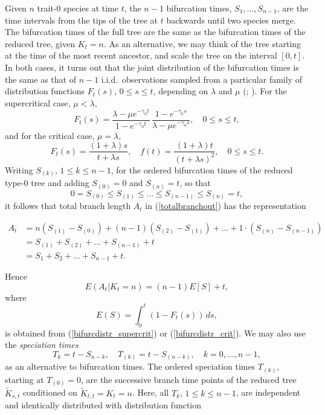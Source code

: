 \documentclass[a4paper,11pt]{article}
\theoremstyle{plain}
\theoremstyle{definition}
\numberwithin{equation}{section}
\begin{document}
Given $n$ trait-$0$ species at time $t$, the $n-1$ bifurcation
times, $S_1,\dots,S_{n-1}$, are the time intervals from the tips of
the tree at $t$ backwards until two species merge. The bifurcation
times of the full tree are the same as the bifurcation times of the
reduced tree, given $K_t=n$.  As an alternative, we may think of the
tree starting at the time of the most recent ancestor, and scale the
tree on the interval $[0,t]$.  In both cases, it turns out that the
joint distribution of the bifurcation times is the same as that of
$n-1$ i.i.d.\ observations sampled from a particular family of distribution
functions $F_t(s)$, $0\le s\le t$, depending on $\lambda$ and $\mu$
(\cite{thompson}; \cite{gernhard}). For the supercritical case, $\mu<\lambda$,
\begin{equation} \label{bifurcdistr_supercrit}
F_t(s)=\frac{\lambda-\mu e^{-\gamma_0t}}{1-e^{-\gamma_0t}}\,
\frac{1-e^{-\gamma_0 s}}{\lambda-\mu e^{-\gamma_0 s}},\quad
0\le s\le t,
\end{equation}
and for the critical case, $\mu=\lambda$,
\begin{equation} \label{bifurcdistr_crit}
F_t(s)=\frac{(1+\lambda) s}{t+\lambda s}, 
\quad f(t)=\frac{(1+\lambda)t}{(t+\lambda s)^2}, \quad 0\le s\le t.
\end{equation} 
Writing $S_{(k)}$, $1\le k\le n-1$, for the ordered bifurcation times
of the reduced type-$0$ tree and adding $S_{(0)}=0$ and
$S_{(n)}=t$, so that
\[
0=S_{(0)}\le S_{(1)}\le \dots \le S_{(n-1)}\le S_{(n)}=t,
\]
it follows that total branch length $A_t$ in (\ref{totalbranchout}) has the representation

\begin{align*} 
A_t&=n(S_{(1)}-S_{(0)})+(n-1)(S_{(2)}-S_{(1)})+\dots +1\cdot(S_{(n)}-S_{(n-1)})\\
   &=S_{(1)}+S_{(2)}+\dots+S_{(n-1)}+t\\
 &=S_{1}+S_{2}+\dots+S_{n-1}+t.
\end{align*} 

\noindent Hence
\begin{equation} \label{expectedA}
E(A_t|K_t=n)=(n-1)E[S]+t,
\end{equation}
where 
\begin{equation} \label{expectedS}
E(S)=\int_0^t(1-F_t(s))\,ds,
\end{equation}
 is obtained
from (\ref{bifurcdistr_supercrit}) or (\ref{bifurcdistr_crit}).
We may also use the {\it speciation times}
\[
T_k=t-S_{n-k},\quad T_{(k)}=t-S_{(n-k)},\quad k=0,\dots,n-1,
\]
as an alternative to bifurcation times.  The ordered speciation times
$T_{(k)}$, starting at $T_{(0)}=0$, are the successive branch time points of
the reduced tree $\widetilde K_{s,t}$ conditioned on $\widetilde
K_{t,t}=K_t=n$.  Here, all $T_k$, $1\le k\le n-1$, are independent and
identically distributed with distribution function
\end{document}
